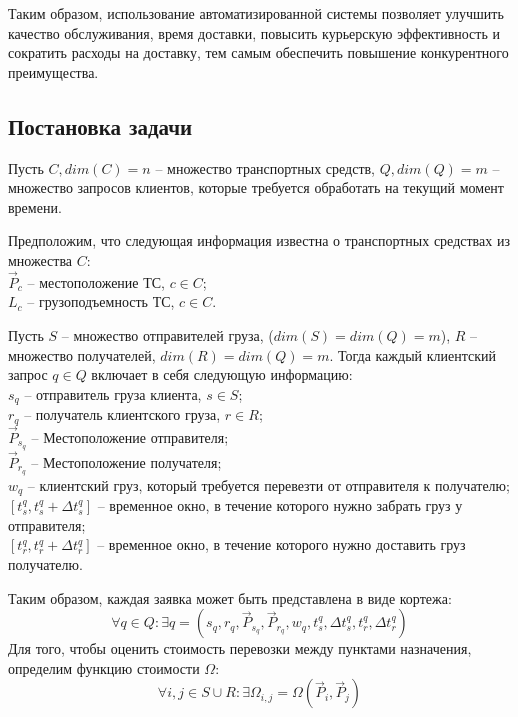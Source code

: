 \documentclass[]{TAACpaper}
\begin{document}
Таким образом, использование автоматизированной системы позволяет улучшить качество обслуживания, время доставки, повысить курьерскую эффективность и сократить расходы на доставку, тем самым обеспечить повышение конкурентного преимущества.

\subsection{Постановка задачи}
Пусть $C,dim(C)=n$ -- множество транспортных средств, $Q,dim(Q)=m$ -- множество запросов клиентов, которые требуется обработать на текущий момент времени.

Предположим, что следующая информация известна о транспортных средствах из множества $C$: \\
$\vec{P}_c$ -- местоположение ТС, $c \in C$;\\
$L_c$ -- грузоподъемность ТС, $c \in C$.

Пусть $S$ -- множество отправителей груза, ($dim(S) = dim(Q) = m$), $R$ -- множество получателей, $dim(R) = dim(Q) = m$. Тогда каждый клиентский запрос $q \in Q$ включает в себя следующую информацию:\\
$s_q$ -- отправитель груза клиента, $s \in S$; \\
$r_q$ -- получатель клиентского груза, $r \in R$; \\
$\vec{P}_{s_q}$ -- Местоположение отправителя;\\
$\vec{P}_{r_q}$ -- Местоположение получателя; \\
$w_q$ -- клиентский груз, который требуется перевезти от отправителя к получателю; \\
$[t_{s}^{q}, t_{s}^{q}+ \Delta{t_{s}^{q}}]$ -- временное окно, в течение которого нужно забрать груз у отправителя;\\ 
$[t_{r}^{q}, t_{r}^{q}+ \Delta{t_{r}^{q}}]$ -- временное окно, в течение которого нужно доставить груз получателю.
 
Таким образом, каждая заявка может быть представлена в виде кортежа:
\begin{equation}
\forall q \in Q: \exists q = (s_q,r_q, \vec{P}_{s_q}, \vec{P}_{r_q}, w_q, t_{s}^{q}, \Delta{t_{s}^{q}}, t_{r}^{q}, \Delta{t_{r}^{q}})
\end{equation}
Для того, чтобы оценить стоимость перевозки между пунктами назначения, определим функцию стоимости $\Omega$:
\begin{equation}
\forall i,j \in S \cup R: \exists \Omega_{i,j} = \Omega(\vec{P}_i,\vec{P}_j)
\end{equation}
\end{document}
